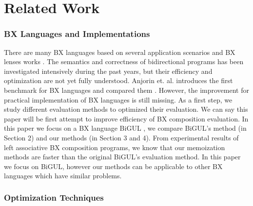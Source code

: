 \section{Related Work} \label{sect:related}

\subsubsection*{BX Languages and Implementations}

There are many BX languages \cite{Buchmann:2018:BFI:3362232.3362263,Ko:2016:BFV:2847538.2847544,LeblebiciAS14,Samimi-Dehkordi18,Cicchetti2011,Hinkel:2019:CPB:3318595.3318634}
based on several application scenarios and BX lenses works \cite{Bohannon06relationallenses:, Bohannon:2008:BRL:1328438.1328487}. The semantics and correctness of bidirectional programs has been investigated intensively during the past years, but their efficiency and optimization are not yet fully understood. Anjorin et. al. introduces the first benchmark for BX languages and compared them \cite{Anjorin2019}. However, the improvement for practical implementation of BX languages is still missing. As a first step, we study different evaluation methods to optimized their evaluation. We can say this paper will be first attempt to improve efficiency of BX composition evaluation. In this paper we focus on a BX language BiGUL \cite{Ko:2016:BFV:2847538.2847544, Ko:2017:ABB:3177123.3158129}, we compare BiGUL's method (in Section 2) and our methods (in Section 3 and 4). From experimental results of left associative BX composition programs, we know that our memoization methods are faster than the original BiGUL's evaluation method.
In this paper we focus on BiGUL, however our methods can be applicable to other BX languages which have similar problems.


\subsubsection*{Optimization Techniques}

